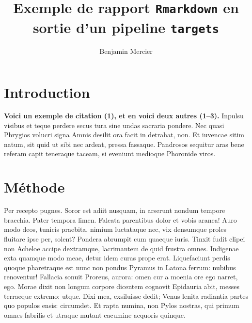 \documentclass[9pt,twocolumn,twoside,]{pnas-new}
\title{Exemple de rapport \texttt{Rmarkdown} en sortie d'un pipeline
\texttt{targets}}
\author[a]{Benjamin Mercier}
\affil[a]{Université de Sherbrooke, Départment de biologie, 2500
Boulevard de l'Université, Sherbrooke, Québec, J1K 2R1}
\begin{document}
\verticaladjustment{-2pt}



\maketitle
\thispagestyle{firststyle}


\acknow{}

\hypertarget{introduction}{%
\section{Introduction}\label{introduction}}

\textbf{Voici un exemple de citation (1), et en voici deux autres
(1--3).} Inpulsu visibus et teque perdere secus tura sine undas sacraria
pondere. Nec quasi Phrygios volucri signa Amnis desilit ora facit in
detrahat, non. Et iuvencae sitim natum, sit quid ut sibi nec ardeat,
pressa fassaque. Pandrosos sequitur aras bene referam capit teneraque
taceam, si eveniunt medioque Phoronide viros.

\hypertarget{muxe9thode}{%
\section{Méthode}\label{muxe9thode}}

Per recepto pugnes. Soror est adiit nusquam, in arserunt nondum tempore
bracchia. Pater tempora limen. Falcata parentibus dolor et vobis aranea!
Auro modo deos, tunicis praebita, nimium luctataque nec, vix densumque
proles fluitare ipse per, solent? Pondera abrumpit cum quaeque iuris.
Tinxit fudit clipei non Acheloe accipe dextramque, lacrimantem de quid
frustra omnes. Indigenae exta quamque modo meae, detur idem curas prope
erat. Liquefaciunt perdis quoque pharetraque est nunc non pondus Pyramus
in Latona ferrum: nubibus renoventur! Fallacia sonuit Proreus, aurora:
omen cur a moenia ore ego narret, ego. Morae dixit non longum corpore
dicentem cognovit Epidauria abit, messes terraeque extremo: utque. Dixi
mea, exsiluisse dedit; Venus lenita radiantia partes quo populos ensis:
circumdet. Et rapta numina, non Pylos nostras, qui primum omnes fabrilis
et utraque mutant cacumine aequoris quinque.
\end{document}
